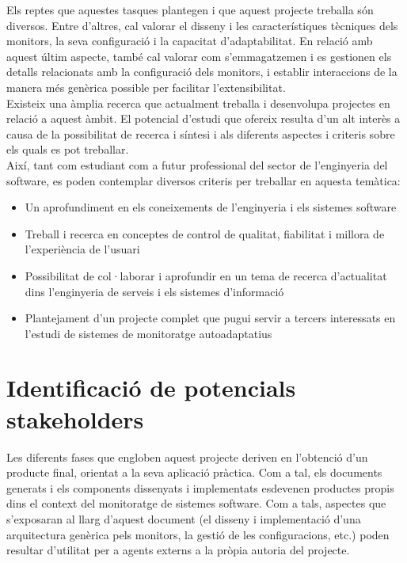 Els reptes que aquestes tasques plantegen i que aquest projecte treballa són diversos. Entre d'altres, cal valorar el disseny i les característiques tècniques dels monitors, la seva configuració i la capacitat d'adaptabilitat. En relació amb aquest últim aspecte, també cal valorar com s'emmagatzemen i es gestionen els detalls relacionats amb la configuració dels monitors, i establir interaccions de la manera més genèrica possible per facilitar l'extensibilitat.\\

Existeix una àmplia recerca que actualment treballa i desenvolupa projectes en relació a aquest àmbit. El potencial d'estudi que ofereix resulta d'un alt interès a causa de la possibilitat de recerca i síntesi i als diferents aspectes i criteris sobre els quals es pot treballar.\\

Així, tant com estudiant com a futur professional del sector de l'enginyeria del software, es poden contemplar diversos criteris per treballar en aquesta temàtica:
\begin{itemize}
\item Un aprofundiment en els coneixements de l'enginyeria i els sistemes software
\item Treball i recerca en conceptes de control de qualitat, fiabilitat i millora de l'experiència de l'usuari
\item Possibilitat de col·laborar i aprofundir en un tema de recerca d'actualitat dins l'enginyeria de serveis i els sistemes d'informació
\item Plantejament d'un projecte complet que pugui servir a tercers interessats en l'estudi de sistemes de monitoratge autoadaptatius
\end{itemize}  

\section{Identificació de potencials stakeholders}

Les diferents fases que engloben aquest projecte deriven en l'obtenció d'un producte final, orientat a la seva aplicació pràctica. Com a tal, els documents generats i els components dissenyats i implementats esdevenen productes propis dins el context del monitoratge de sistemes software. Com a tals, aspectes que s'exposaran al llarg d'aquest document (el disseny i implementació d'una arquitectura genèrica pels monitors, la gestió de les configuracions, etc.) poden resultar d'utilitat per a agents externs a la pròpia autoria del projecte.\\

